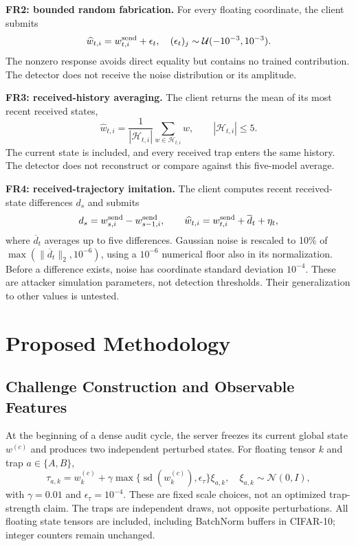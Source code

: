 \documentclass[conference]{IEEEtran}
\begin{document}
\medskip\noindent\textbf{FR2: bounded random fabrication.}
For every floating coordinate, the client submits
\begin{equation}
 \widehat w_{t,i}=w^{\rm send}_{t,i}+\epsilon_t,\quad
 (\epsilon_t)_j\sim\mathcal U(-10^{-3},10^{-3}).
\end{equation}
The nonzero response avoids direct equality but contains no trained contribution.
The detector does not receive the noise distribution or its amplitude.

\medskip\noindent\textbf{FR3: received-history averaging.}
The client returns the mean of its most recent received states,
\begin{equation}
 \widehat w_{t,i}=\frac{1}{|\mathcal H_{t,i}|}
       \sum_{w\in\mathcal H_{t,i}}w,\qquad |\mathcal H_{t,i}|\leq5.
\end{equation}
The current state is included, and every received trap enters the same history.
The detector does not reconstruct or compare against this five-model average.

\medskip\noindent\textbf{FR4: received-trajectory imitation.}
The client computes recent received-state differences $d_s$ and submits
\begin{equation}
 d_s=w^{\rm send}_{s,i}-w^{\rm send}_{s-1,i},\qquad
 \widehat w_{t,i}=w^{\rm send}_{t,i}+\overline d_t+\eta_t,
\end{equation}
where $\overline d_t$ averages up to five differences. Gaussian noise is rescaled
to 10\% of $\max(\|\overline d_t\|_2,10^{-6})$, using a $10^{-6}$ numerical floor
also in its normalization. Before a difference exists, noise has coordinate
standard deviation $10^{-4}$. These are attacker simulation parameters, not
detection thresholds. Their generalization to other values is untested.

\section{Proposed Methodology}
\subsection{Challenge Construction and Observable Features}
At the beginning of a dense audit cycle, the server freezes its current global
state $w^{(c)}$ and produces two independent perturbed states. For floating
tensor $k$ and trap $a\in\{A,B\}$,
\begin{equation}
 \tau_{a,k}=w^{(c)}_k+
 \gamma\max\{\operatorname{sd}(w^{(c)}_k),\epsilon_\tau\}\xi_{a,k},
 \quad\xi_{a,k}\sim\mathcal N(0,I),
\end{equation}
with $\gamma=0.01$ and $\epsilon_\tau=10^{-4}$. These are fixed scale choices,
not an optimized trap-strength claim. The traps are independent draws, not
opposite perturbations. All floating state tensors are included, including
BatchNorm buffers in CIFAR-10; integer counters remain unchanged.
\end{document}

